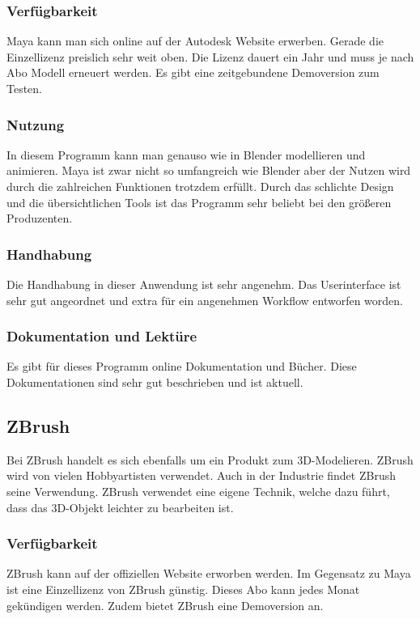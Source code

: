 \subsubsection{Verfügbarkeit}
Maya kann man sich online auf der Autodesk Website erwerben. Gerade die Einzellizenz preislich sehr weit oben. Die Lizenz dauert ein Jahr und muss je nach Abo Modell erneuert werden. Es gibt eine zeitgebundene Demoversion zum Testen.

\subsubsection{Nutzung}
In diesem Programm kann man genauso wie in Blender modellieren und animieren. Maya ist zwar nicht so umfangreich wie Blender aber der Nutzen wird durch die zahlreichen Funktionen trotzdem erfüllt. Durch das schlichte Design und die übersichtlichen Tools ist das Programm sehr beliebt bei den größeren Produzenten.

\subsubsection{Handhabung}
Die Handhabung in dieser Anwendung ist sehr angenehm. Das Userinterface ist sehr gut angeordnet und extra für ein angenehmen Workflow entworfen worden.

\subsubsection{Dokumentation und Lektüre}
Es gibt für dieses Programm online Dokumentation und Bücher. Diese Dokumentationen sind sehr gut beschrieben und ist aktuell.

\pagebreak

\subsection{ZBrush}
Bei ZBrush handelt es sich ebenfalls um ein Produkt zum 3D-Modelieren. ZBrush wird von vielen Hobbyartisten verwendet. Auch in der Industrie findet ZBrush seine Verwendung. ZBrush verwendet eine eigene Technik, welche dazu führt, dass das 3D-Objekt leichter zu bearbeiten ist.

\subsubsection{Verfügbarkeit}
ZBrush kann auf der offiziellen Website erworben werden. Im Gegensatz zu Maya ist eine Einzellizenz von ZBrush günstig. Dieses Abo kann jedes Monat gekündigen werden. Zudem bietet ZBrush eine Demoversion an.

